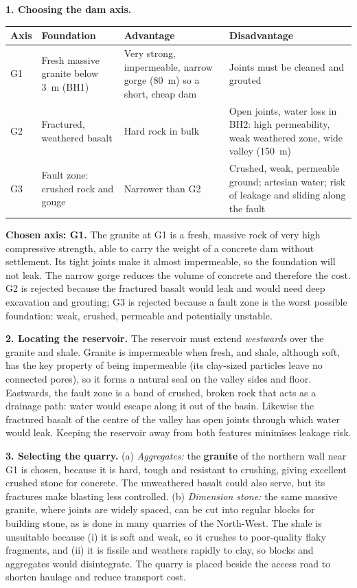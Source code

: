 \documentclass[11pt]{article}
\newcommand{\cle}[1]{{\popxbold\color{popdark}#1}}
\newcounter{popsec}
\newcounter{popsub}
\newcommand{\courssub}[1]{%
  \stepcounter{popsub}%
  \par\vspace{9pt}\noindent{\popxbold\fontsize{11.5}{13}\selectfont\color{popink}{\color{poporange}\thepopsec.\thepopsub}\hspace{6pt}#1}\par\nopagebreak\vspace{4pt}
}
\begin{document}
\courssub{Model answer}

\textbf{1. Choosing the dam axis.}

\begin{center}
\begin{tabularx}{\linewidth}{|l|X|X|X|}\hline
\rowcolor{popblueL} \textbf{Axis} & \textbf{Foundation} & \textbf{Advantage} & \textbf{Disadvantage} \\ \hline
G1 & Fresh massive granite below \SI{3}{m} (BH1) & Very strong, impermeable, narrow gorge (\SI{80}{m}) so a short, cheap dam & Joints must be cleaned and grouted \\ \hline
G2 & Fractured, weathered basalt & Hard rock in bulk & Open joints, water loss in BH2: high permeability, weak weathered zone, wide valley (\SI{150}{m}) \\ \hline
G3 & Fault zone: crushed rock and gouge & Narrower than G2 & Crushed, weak, permeable ground; artesian water; risk of leakage and sliding along the fault \\ \hline
\end{tabularx}
\end{center}

\textbf{Chosen axis: G1.} The granite at G1 is a \cle{fresh}, \cle{massive} rock of very high compressive strength, able to carry the weight of a concrete dam without settlement. Its tight joints make it almost impermeable, so the foundation will not leak. The narrow gorge reduces the volume of concrete and therefore the cost. G2 is rejected because the fractured basalt would leak and would need deep excavation and grouting; G3 is rejected because a fault zone is the worst possible foundation: weak, crushed, permeable and potentially unstable.

\textbf{2. Locating the reservoir.} The reservoir must extend \emph{westwards} over the granite and shale. Granite is impermeable when fresh, and shale, although soft, has the key property of being \cle{impermeable} (its clay-sized particles leave no connected pores), so it forms a natural seal on the valley sides and floor. Eastwards, the fault zone is a band of crushed, broken rock that acts as a \cle{drainage path}: water would escape along it out of the basin. Likewise the fractured basalt of the centre of the valley has open joints through which water would leak. Keeping the reservoir away from both features minimises leakage risk.

\textbf{3. Selecting the quarry.} (a) \emph{Aggregates:} the \textbf{granite} of the northern wall near G1 is chosen, because it is hard, tough and resistant to crushing, giving excellent crushed stone for concrete. The unweathered basalt could also serve, but its fractures make blasting less controlled. (b) \emph{Dimension stone:} the same massive granite, where joints are widely spaced, can be cut into regular blocks for building stone, as is done in many quarries of the North-West. The shale is unsuitable because (i) it is soft and weak, so it crushes to poor-quality flaky fragments, and (ii) it is fissile and weathers rapidly to clay, so blocks and aggregates would disintegrate. The quarry is placed beside the access road to shorten haulage and reduce transport cost.
\end{document}
